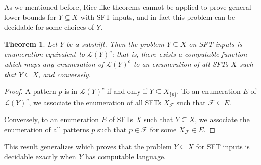 \documentclass[a4paper]{article}
\newcommand{\F}{\mathcal{F}}
\newcommand{\Le}{\mathcal{L}}
\newcommand{\coLe}{\mathcal{L}^c}
\newcommand{\Z}{\mathbb{Z}}
\newtheorem{theorem}{Theorem}[section]
\theoremstyle{definition}
\begin{document}
As we mentioned before, Rice-like theorems cannot be applied to prove general lower bounds for $Y\subseteq X$ with SFT inputs, and in fact this problem can be decidable for some choices of $Y$. 
\begin{theorem}\label{characterization-complexity-inclusion}
    Let $Y$ be a 
    subshift. Then the problem $Y\subseteq X$ on SFT inputs is enumeration-equivalent to $\Le(Y)^c$; that is, there exists a computable function which maps any enumeration of $\Le(Y)^c$ to an enumeration of all SFTs $X$ such that $Y \subseteq X$, and conversely.
\end{theorem}
\begin{proof}
    A pattern $p$ is in $\Le(Y)^c$ if and only if $Y \subseteq X_{\{p\}}$. To an enumeration $E$ of $\Le(Y)^c$, we associate the enumeration of all SFTs $X_{\F}$ such that $\F \subseteq E$.

    Conversely, to an enumeration $E$ of SFTs $X$ such that $Y \subseteq X$, we associate the enumeration of all patterns $p$ such that $p \in \F$ for some $X_{\F} \in E$.
\end{proof}
This result generalizes \cite[Proposition 6.2]{carrasco-vargas_rice_2025} which proves that the problem $Y\subseteq X$ for SFT inputs is decidable exactly when $Y$ has computable language. 
\end{document}
